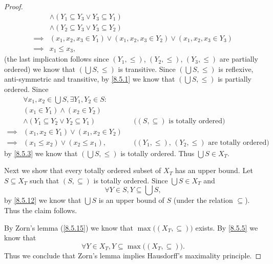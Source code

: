 \begin{proof}
\begin{align*}
             & \land (Y_1 \subseteq Y_3 \lor Y_3 \subseteq Y_1)                                                                                      \\
             & \land (Y_2 \subseteq Y_3 \lor Y_3 \subseteq Y_2)                                                                                      \\
    \implies & (x_1, x_2, x_3 \in Y_1) \lor (x_1, x_2, x_3 \in Y_2) \lor (x_1, x_2, x_3 \in Y_3)                                                     \\
    \implies & x_1 \leq x_3,
  \end{align*}
  (the last implication follows since \((Y_1, \leq)\), \((Y_2, \leq)\), \((Y_3, \leq)\) are partially ordered)
  we know that \((\bigcup S, \leq)\) is transitive.
  Since \((\bigcup S, \leq)\) is reflexive, anti-symmetric and transitive, by \cref{8.5.1} we know that \((\bigcup S, \leq)\) is partially ordered.
  Since
  \begin{align*}
             & \forall x_1, x_2 \in \bigcup S, \exists Y_1, Y_2 \in S :                                                                    \\
             & (x_1 \in Y_1) \land (x_2 \in Y_2)                                                                                           \\
             & \land (Y_1 \subseteq Y_2 \lor Y_2 \subseteq Y_1)         &  & \text{(\((S, \subseteq)\) is totally ordered)}                \\
    \implies & (x_1, x_2 \in Y_1) \lor (x_1, x_2 \in Y_2)                                                                                  \\
    \implies & (x_1 \leq x_2) \lor (x_2 \leq x_1),                      &  & \text{(\((Y_1, \leq)\), \((Y_2, \leq)\) are totally ordered)}
  \end{align*}
  by \cref{8.5.3} we know that \((\bigcup S, \leq)\) is totally ordered.
  Thus \(\bigcup S \in X_T\).

  Next we show that every totally ordered subset of \(X_T\) has an upper bound.
  Let \(S \subseteq X_T\) such that \((S, \subseteq)\) is totally ordered.
  Since \(\bigcup S \in X_T\) and
  \[
    \forall Y \in S, Y \subseteq \bigcup S,
  \]
  by \cref{8.5.12} we know that \(\bigcup S\) is an upper bound of \(S\) (under the relation \(\subseteq\)).
  Thus the claim follows.

  By Zorn's lemma (\cref{8.5.15}) we know that \(\max\big((X_T, \subseteq)\big)\) exists.
  By \cref{8.5.5} we know that
  \[
    \forall Y \in X_T, Y \subseteq \max\big((X_T, \subseteq)\big).
  \]
  Thus we conclude that Zorn's lemma implies Hausdorff's maximality principle.


\end{proof}
